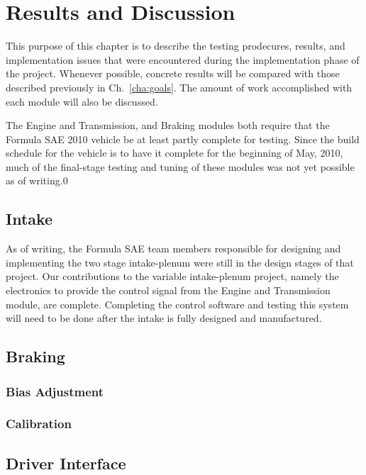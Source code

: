 \chapter{Results and Discussion}

This purpose of this chapter is to describe the testing prodecures, results, and implementation issues that were encountered during the implementation phase of the project. Whenever possible, concrete results will be compared with those described previously in Ch.\ \ref{cha:goals}. The amount of work accomplished with each module will also be discussed.

The Engine and Transmission, and Braking modules both require that the Formula SAE 2010 vehicle be at least partly complete for testing. Since the build schedule for the vehicle is to have it complete for the beginning of May, 2010, much of the final-stage testing and tuning of these modules was not yet possible as of writing.0




\section{Intake}

As of writing, the Formula SAE team members responsible for designing and implementing the two stage intake-plenum were still in the design stages of that project. Our contributions to the variable intake-plenum project, namely the electronics to provide the control signal from the Engine and Transmission module, are complete. Completing the control software and testing this system will need to be done after the intake is fully designed and manufactured.

\section{Braking}


\subsection{Bias Adjustment}


\subsection{Calibration}





\section{Driver Interface}



